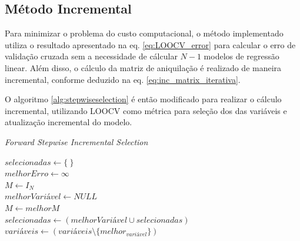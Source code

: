 \subsection{Método Incremental}

Para minimizar o problema do custo computacional, o método implementado utiliza o resultado apresentado na eq. 
\ref{eq:LOOCV_error} para calcular o erro de validação cruzada sem a necessidade de cálcular $N-1$ modelos de 
regressão linear. Além disso, o cálculo da matriz de aniquilação é realizado de maneira incremental, conforme 
deduzido na eq. \ref{eq:inc_matrix_iterativa}.

O algoritmo \ref{alg:stepwiseselection} é então modificado para realizar o cálculo incremental, utilizando 
LOOCV como métrica para seleção dos das variáveis e atualização incremental do modelo.

\qquad

\begin{algorithm}[H]
    \caption{\textit{Forward Stepwise Incremental Selection}}
    
    $selecionadas \gets \{\ \}$ \\
    $melhorErro \gets \infty$ \\
    $M \gets I_N$ \\

    { 
        $melhorVariável \gets NULL$ \\
        $M \gets melhorM $ \\
        $selecionadas \gets (melhorVariável \cup selecionadas)$ \\
        $variáveis \gets (variáveis \setminus \{melhor_{variável}\})$ \\
    }
    \label{alg:incstepwiseselection}
\end{algorithm}



